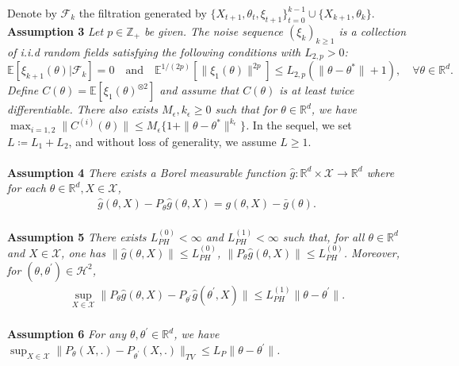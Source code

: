 \documentclass[a4paper]{article}
\newcommand{\norm}[1]{\|#1 \|}
\newcommand{\Exs}{\mathbb{E}}
\newcommand{\thetastar}{\theta^*}
\newcommand{\constLPH}[1]{L_{PH}^{(#1)}}
\begin{document}
Denote by $\mathcal{F}_{k}$ the filtration generated by $\{X_{t + 1}, \theta_{t}, \xi_{t + 1}\}_{t = 0}^{k - 1} \cup \{X_{k + 1}, \theta_{k}\}$.
\\
\textbf{Assumption 3} \textit{
	Let $p \in \mathbb{Z}_{+}$ be given. The noise sequence $\left(\xi_{k}\right)_{k \ge 1}$ is a collection of i.i.d random fields satisfying the following conditions with $L_{2, p} > 0$:
	$$\Exs\left[\xi_{k + 1}(\theta) | \mathcal{F}_{k}\right] = 0 \quad \text{and} \quad \Exs^{1 / (2p)}\left[\norm{\xi_{1}(\theta)}^{2p}\right] \le L_{2, p}\left(\norm{\theta - \thetastar} + 1\right), \quad \forall \theta \in \mathbb{R}^{d}.$$
	Define $C(\theta) = \Exs\left[\xi_{1}(\theta)^{\otimes 2}\right]$ and assume that $C(\theta)$ is at least twice differentiable. There also exists $M_{\epsilon}, k_{\epsilon} \ge 0$ such that for $\theta \in \mathbb{R}^{d}$, we have $\max_{i = 1, 2}\norm{C^{(i)}(\theta)} \le M_{\epsilon}\{1 + \norm{\theta - \thetastar}^{k_{\epsilon}}\}$.
}
In the sequel, we set $L \coloneq L_{1} + L_{2}$, and without loss of generality, we assume $L \ge 1$.
\\
\\
\textbf{Assumption 4} \textit{
	There exists a Borel measurable function $\hat{g}: \mathbb{R}^{d} \times \mathcal{X} \to \mathbb{R}^{d}$ where for each $\theta \in \mathbb{R}^{d}, X \in \mathcal{X}$,
	\begin{align*}
		\hat{g}\left(\theta, X\right) - P_{\theta}\hat{g}\left(\theta, X\right) = g\left(\theta, X\right) - \bar{g}\left(\theta\right).
	\end{align*}
}
\\
\textbf{Assumption 5} \textit{
	There exists $\constLPH{0} <‌ \infty$ and $\constLPH{1} < \infty$ such that, for all $\theta \in \mathbb{R}^{d}$ and $X \in \mathcal{X}$, one has $\norm{\hat{g}\left(\theta, X\right)} \le \constLPH{0}$, $\norm{P_{\theta}\hat{g}\left(\theta, X\right)} \le \constLPH{0}$. Moreover, for $\left(\theta, \theta^{\prime}\right) \in \mathcal{H}^{2}$,
	\begin{align*}
		\sup_{X \in \mathcal{X}}\norm{P_{\theta}\hat{g}\left(\theta, X\right) - P_{\theta^{\prime}}\hat{g}\left(\theta^{\prime}, X\right)} \le \constLPH{1}\norm{\theta - \theta^{\prime}}.
	\end{align*}
}
\\
\textbf{Assumption 6} \textit{
	For any $\theta, \theta^{\prime} \in \mathbb{R}^{d}$, we have $\sup_{X \in \mathcal{X}}\norm{P_{\theta}\left(X, .\right) - P_{\theta^{\prime}}\left(X, .\right)}_{TV} \le L_{P}\norm{\theta - \theta^{\prime}}$.
}
\end{document}
